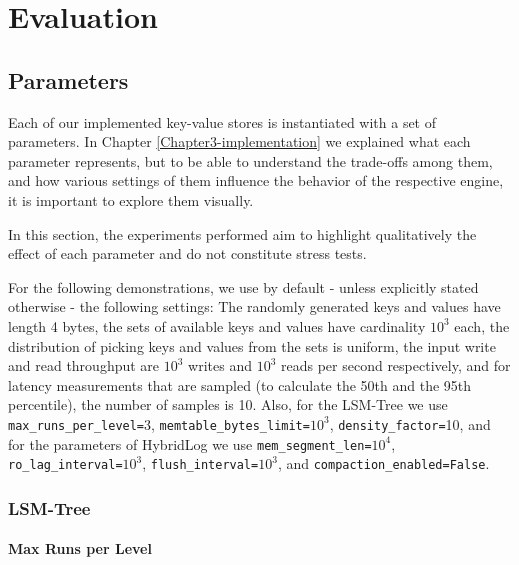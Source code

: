 
\chapter{Evaluation}

\label{Chapter4-evaluation}


\section{Parameters}

Each of our implemented key-value stores is instantiated with a set of parameters. In Chapter \ref{Chapter3-implementation} we explained what each parameter represents, but to be able to understand the trade-offs among them, and how various settings of them influence the behavior of the respective engine, it is important to explore them visually.

In this section, the experiments performed aim to highlight qualitatively the effect of each parameter and do not constitute stress tests.

For the following demonstrations, we use by default - unless explicitly stated otherwise - the following settings: The randomly generated keys and values have length 4 bytes, the sets of available keys and values have cardinality $10^3$ each, the distribution of picking keys and values from the sets is uniform, the input write and read throughput are $10^3$ writes and $10^3$ reads per second respectively, and for latency measurements that are sampled (to calculate the 50th and the 95th percentile), the number of samples is 10. Also, for the LSM-Tree we use \verb"max_runs_per_level="3, \verb"memtable_bytes_limit="$10^3$, \verb"density_factor="10, and for the parameters of HybridLog we use \verb"mem_segment_len="$10^4$, \verb"ro_lag_interval="$10^3$, \verb"flush_interval="$10^3$, and \verb"compaction_enabled=False".

\subsection{LSM-Tree}

\subsubsection{Max Runs per Level}

